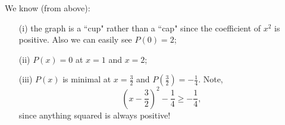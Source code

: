 We know (from above):
\begin{itemize}
\item[(i)] the graph is a ``cup" rather than a ``cap" since the coefficient of $x^2$ is positive. Also we can easily see $P(0)=2$;
\item[(ii)] $P(x)=0$ at $x=1$ and $x=2$;
\item[(iii)] $P(x)$ is minimal at $x=\frac{3}{2}$ and $P\left(\frac{3}{2}\right)=-\frac{1}{4}$. Note, 
\[\left(x-\frac{3}{2}\right)^2-\frac{1}{4} \ge -\frac{1}{4},\] 
since anything squared is always positive!
\end{itemize}

